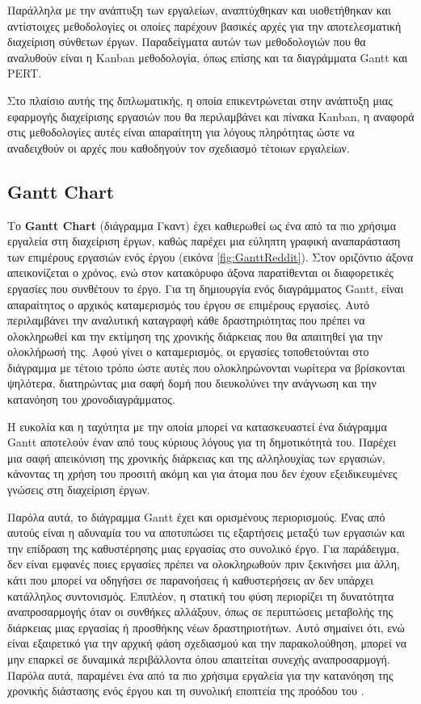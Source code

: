         Παράλληλα με την ανάπτυξη των εργαλείων, αναπτύχθηκαν και υιοθετήθηκαν και αντίστοιχες μεθοδολογίες οι οποίες παρέχουν βασικές αρχές για την αποτελεσματική διαχείριση σύνθετων έργων. Παραδείγματα αυτών των μεθοδολογιών που θα αναλυθούν είναι η Kanban μεθοδολογία, όπως επίσης και τα διαγράμματα Gantt και PERT.

        Στο πλαίσιο αυτής της διπλωματικής, η οποία επικεντρώνεται στην ανάπτυξη μιας εφαρμογής διαχείρισης εργασιών που θα περιλαμβάνει και πίνακα Kanban, η αναφορά στις μεθοδολογίες αυτές είναι απαραίτητη για λόγους πληρότητας ώστε να αναδειχθούν οι αρχές που καθοδηγούν τον σχεδιασμό τέτοιων εργαλείων.

        \subsection{Gantt Chart}
            Το \textbf{Gantt Chart} (διάγραμμα Γκαντ) έχει καθιερωθεί ως ένα από τα πιο χρήσιμα εργαλεία στη διαχείριση έργων, καθώς παρέχει μια εύληπτη γραφική αναπαράσταση των επιμέρους εργασιών ενός έργου (εικόνα \ref{fig:GanttReddit}). Στον οριζόντιο άξονα απεικονίζεται ο χρόνος, ενώ στον κατακόρυφο άξονα παρατίθενται οι διαφορετικές εργασίες που συνθέτουν το έργο.  Για τη δημιουργία ενός διαγράμματος Gantt, είναι απαραίτητος ο αρχικός καταμερισμός του έργου σε επιμέρους εργασίες. Αυτό περιλαμβάνει την αναλυτική καταγραφή κάθε δραστηριότητας που πρέπει να ολοκληρωθεί και την εκτίμηση της χρονικής διάρκειας που θα απαιτηθεί για την ολοκλήρωσή της. Αφού γίνει ο καταμερισμός, οι εργασίες τοποθετούνται στο διάγραμμα με τέτοιο τρόπο ώστε αυτές που ολοκληρώνονται νωρίτερα να βρίσκονται ψηλότερα, διατηρώντας μια σαφή δομή που διευκολύνει την ανάγνωση και την κατανόηση του χρονοδιαγράμματος.

            Η ευκολία και η ταχύτητα με την οποία μπορεί να κατασκευαστεί ένα διάγραμμα Gantt αποτελούν έναν από τους κύριους λόγους για τη δημοτικότητά του. Παρέχει μια σαφή απεικόνιση της χρονικής διάρκειας και της αλληλουχίας των εργασιών, κάνοντας τη χρήση του προσιτή ακόμη και για άτομα που δεν έχουν εξειδικευμένες γνώσεις στη διαχείριση έργων.

            Παρόλα αυτά, το διάγραμμα Gantt έχει και ορισμένους περιορισμούς. Ένας από αυτούς είναι η αδυναμία του να αποτυπώσει τις εξαρτήσεις μεταξύ των εργασιών και την επίδραση της καθυστέρησης μιας εργασίας στο συνολικό έργο. Για παράδειγμα, δεν είναι εμφανές ποιες εργασίες πρέπει να ολοκληρωθούν πριν ξεκινήσει μια άλλη, κάτι που μπορεί να οδηγήσει σε παρανοήσεις ή καθυστερήσεις αν δεν υπάρχει κατάλληλος συντονισμός. Επιπλέον, η στατική του φύση περιορίζει τη δυνατότητα αναπροσαρμογής όταν οι συνθήκες αλλάξουν, όπως σε περιπτώσεις μεταβολής της διάρκειας μιας εργασίας ή προσθήκης νέων δραστηριοτήτων. Αυτό σημαίνει ότι, ενώ είναι εξαιρετικό για την αρχική φάση σχεδιασμού και την παρακολούθηση, μπορεί να μην επαρκεί σε δυναμικά περιβάλλοντα όπου απαιτείται συνεχής αναπροσαρμογή. Παρόλα αυτά, παραμένει ένα από τα πιο χρήσιμα εργαλεία για την κατανόηση της χρονικής διάστασης ενός έργου και τη συνολική εποπτεία της προόδου του \cite{Xenos}.

